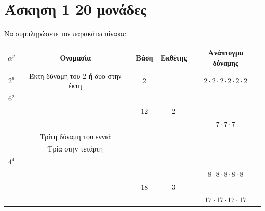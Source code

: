 \documentclass[a4paper,10pt]{report}
\begin{document}
\section*{Άσκηση 1  \hfill \small{20 μονάδες}}
Να συμπληρώσετε τον παρακάτω πίνακα: 
\begin{center}
 \begin{tabular}{|c|c|c|c|c|}
\hline                   
$α^{ν}$       & \textbf{Ονομασία}      &  \textbf{Βάση}       &  \textbf{Εκθέτης}     &  \textbf{Ανάπτυγμα δύναμης}   \\
\hline 
 $2^{6}$             & Έκτη δύναμη του 2 \textbf{ή} δύο στην έκτη &   2  &            & $2\cdot2\cdot2\cdot2\cdot2\cdot2$          \\
\hline 
 $6^{2}$             &                        &                      &                         &           \\
\hline 
                     &                        &     $12$             &  2                       &           \\
\hline 
               &                       &                       &                        &    $7\cdot7\cdot7$       \\
\hline 
               & Τρίτη δύναμη του εννιά                      &                       &                        &           \\
\hline
               & Τρία στην τετάρτη                      &                       &                        &           \\
\hline
$4^{4}$        &                       &                       &                        &           \\
\hline
               &                       &                       &                        & $8\cdot8\cdot8\cdot8\cdot8$          \\
\hline
               &                       &              $18$         &    $3$                    &           \\
\hline
               &                       &                       &                        &$17\cdot17\cdot17\cdot17$         \\
\hline
\end{tabular}
\end{center}
\end{document}
